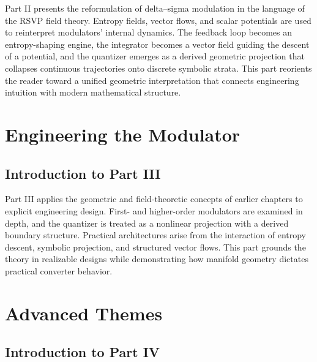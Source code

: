 \documentclass[12pt,oneside]{book}
\theoremstyle{definition}
\theoremstyle{plain}
\begin{document}
Part II presents the reformulation of delta--sigma modulation in the language of the RSVP field theory. Entropy fields, vector flows, and scalar potentials are used to reinterpret modulators’ internal dynamics. The feedback loop becomes an entropy-shaping engine, the integrator becomes a vector field guiding the descent of a potential, and the quantizer emerges as a derived geometric projection that collapses continuous trajectories onto discrete symbolic strata. This part reorients the reader toward a unified geometric interpretation that connects engineering intuition with modern mathematical structure.






\part{Engineering the Modulator}

\chapter*{Introduction to Part III}

Part III applies the geometric and field-theoretic concepts of earlier chapters to explicit engineering design. First- and higher-order modulators are examined in depth, and the quantizer is treated as a nonlinear projection with a derived boundary structure. Practical architectures arise from the interaction of entropy descent, symbolic projection, and structured vector flows. This part grounds the theory in realizable designs while demonstrating how manifold geometry dictates practical converter behavior.







\part{Advanced Themes}

\chapter*{Introduction to Part IV}
\end{document}
